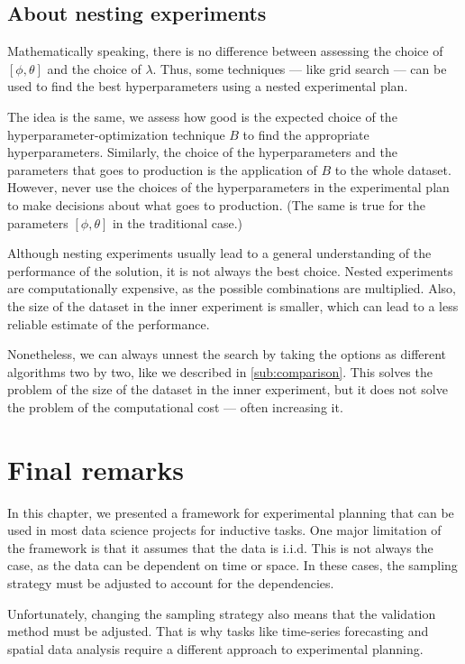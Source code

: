\subsection{About nesting experiments}

Mathematically speaking, there is no difference between assessing the choice of
$\left[\phi, \theta\right]$ and the choice of $\lambda$.  Thus, some techniques --- like
grid search --- can be used to find the best hyperparameters using a nested experimental
plan.

The idea is the same, we assess how good is the expected choice of the
hyperparameter-optimization technique $B$ to find the appropriate hyperparameters.  Similarly,
the choice of the hyperparameters and the parameters that goes to production is the
application of $B$ to the whole dataset.  However, never use the choices of the
hyperparameters in the experimental plan to make decisions about what goes to production.
(The same is true for the parameters $\left[\phi, \theta\right]$ in the traditional case.)

Although nesting experiments usually lead to a general understanding of the performance of
the solution, it is not always the best choice.  Nested experiments are computationally
expensive, as the possible combinations are multiplied.  Also, the size of the dataset
in the inner experiment is smaller, which can lead to a less reliable estimate of the
performance.

Nonetheless, we can always unnest the search by taking the options as different
algorithms two by two, like we described in \cref{sub:comparison}.  This solves the
problem of the size of the dataset in the inner experiment, but it does not solve the
problem of the computational cost --- often increasing it.

\section{Final remarks}

In this chapter, we presented a framework for experimental planning that can be used in
most data science projects for inductive tasks.  One major limitation of the framework is
that it assumes that the data is i.i.d.  This is not always the case, as the data can be
dependent on time or space.  In these cases, the sampling strategy must be adjusted to
account for the dependencies.

Unfortunately, changing the sampling strategy also means that the validation method must
be adjusted.  That is why tasks like time-series forecasting and spatial data analysis
require a different approach to experimental planning.

